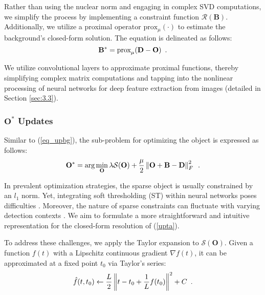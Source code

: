 \documentclass[10pt,journal,compsoc]{IEEEtran}
\begin{document}
Rather than using the nuclear norm and engaging in complex SVD computations, we simplify the process by implementing a constraint function $\mathcal{R}(\mathbf{B})$.
Additionally, we utilize a proximal operator ${\text{pro}}{{\text{x}}_\mu}( \cdot )$ to estimate the background’s closed-form solution. The equation is delineated as follows:
\begin{equation}
\setlength{\abovedisplayskip}{1pt}
\setlength{\belowdisplayskip}{0pt}
    \mathbf{B}^* = {\text{prox}}_{\mu}(\mathbf{D} - \mathbf{O})\enspace.  
\label{proxB}
\end{equation}

We utilize convolutional layers to approximate proximal functions, thereby simplifying complex matrix computations and tapping into the nonlinear processing of neural networks for deep feature extraction from images (detailed in Section \ref{sec:3.3}).
\vspace{-0.2cm}
\subsubsection{$\mathbf{O}^*$ Updates} Similar to (\ref{eq_upbg}), the sub-problem for optimizing the object is expressed as follows:
\begin{equation}
\setlength{\abovedisplayskip}{2pt}
\setlength{\belowdisplayskip}{2pt}
    \mathbf{O}^* = \arg \min \limits_{\mathbf{O}} \lambda \mathcal{S}(\mathbf{O}) + \frac{\mu}{2} \left\| \mathbf{O} + \mathbf{B} - \mathbf{D} \right\|^2_F \enspace.
\label{upta}
\end{equation}

In prevalent optimization strategies, the sparse object is usually constrained by an \( l_1 \) norm. Yet, integrating soft thresholding (ST) within neural networks poses difficulties \cite{zhang-2018-istanet}. Moreover, the nature of sparse constraints can fluctuate with varying detection contexts \cite{zhang-2021-srws}. We aim to formulate a more straightforward and intuitive representation for the closed-form resolution of (\ref{upta}).

To address these challenges, we apply the Taylor expansion to $\mathcal{S}(\mathbf{O})$. Given a function \(f(t)\) with a Lipschitz continuous gradient \(\nabla f(t)\), it can be approximated at a fixed point \(t_0\) via Taylor's series:
\begin{equation}
\setlength{\abovedisplayskip}{1pt}
\setlength{\belowdisplayskip}{1pt}
\hat f(t,{t_0})  \leftarrow \frac{L}{2}\left\| {t - {t_0} + \frac{1}{L}f({t_0})} \right\|^2 + C \enspace.
\end{equation}
\end{document}
